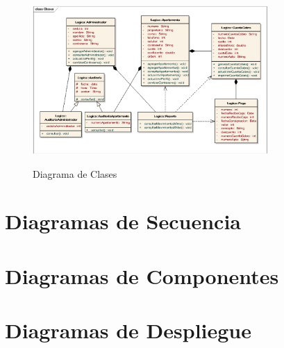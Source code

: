 \begin{figure}[ht] 
\centering
\caption{Diagrama de Clases}
\includegraphics[width=0.8\textwidth]{img/diagramaClases.png}
\label{fig:Diagrama-de-Clases}  
\end{figure} 

\section{Diagramas de Secuencia}

\section{Diagramas de Componentes}

\section{Diagramas de Despliegue}

